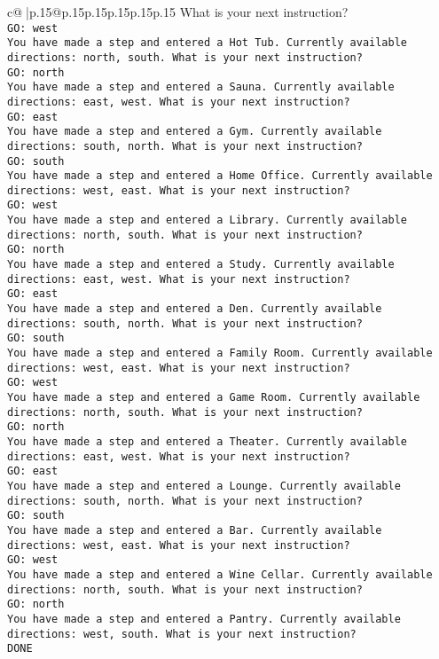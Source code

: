 \documentclass{article}
\begin{document}
{\begin{supertabular}{c@{$\;$}|p{.15\linewidth}@{}p{.15\linewidth}p{.15\linewidth}p{.15\linewidth}p{.15\linewidth}p{.15\linewidth}}
{{{What is your next instruction?\\ \tt GO: west\\ \tt You have made a step and entered a Hot Tub. Currently available directions: north, south. What is your next instruction?\\ \tt GO: north\\ \tt You have made a step and entered a Sauna. Currently available directions: east, west. What is your next instruction?\\ \tt GO: east\\ \tt You have made a step and entered a Gym. Currently available directions: south, north. What is your next instruction?\\ \tt GO: south\\ \tt You have made a step and entered a Home Office. Currently available directions: west, east. What is your next instruction?\\ \tt GO: west\\ \tt You have made a step and entered a Library. Currently available directions: north, south. What is your next instruction?\\ \tt GO: north\\ \tt You have made a step and entered a Study. Currently available directions: east, west. What is your next instruction?\\ \tt GO: east\\ \tt You have made a step and entered a Den. Currently available directions: south, north. What is your next instruction?\\ \tt GO: south\\ \tt You have made a step and entered a Family Room. Currently available directions: west, east. What is your next instruction?\\ \tt GO: west\\ \tt You have made a step and entered a Game Room. Currently available directions: north, south. What is your next instruction?\\ \tt GO: north\\ \tt You have made a step and entered a Theater. Currently available directions: east, west. What is your next instruction?\\ \tt GO: east\\ \tt You have made a step and entered a Lounge. Currently available directions: south, north. What is your next instruction?\\ \tt GO: south\\ \tt You have made a step and entered a Bar. Currently available directions: west, east. What is your next instruction?\\ \tt GO: west\\ \tt You have made a step and entered a Wine Cellar. Currently available directions: north, south. What is your next instruction?\\ \tt GO: north\\ \tt You have made a step and entered a Pantry. Currently available directions: west, south. What is your next instruction?\\ \tt DONE 
}}}
\end{supertabular}}
\end{document}
